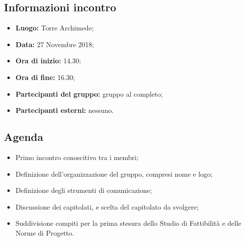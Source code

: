 \subsection{Informazioni incontro}
\begin{itemize}
	\item { \textbf{Luogo:} Torre Archimede};
	\item { \textbf{Data:} 27 Novembre 2018};
	\item { \textbf{Ora di inizio:} 14.30};
	\item { \textbf{Ora di fine:} 16.30};
	\item { \textbf{Partecipanti del gruppo:} gruppo al completo};
	\item { \textbf{Partecipanti esterni:} nessuno}.
\end{itemize}


\subsection{Agenda}
\begin{itemize}
	\item {Primo incontro conoscitivo tra i membri;}
	\item {Definizione dell'organizzazione del gruppo, compresi nome e logo;}
	\item {Definizione degli strumenti di comunicazione;}
	\item {Discussione dei capitolati, e scelta del capitolato da svolgere;}
	\item {Suddivisione compiti per la prima stesura dello Studio di Fattibilità e delle Norme di Progetto.}
\end{itemize}


